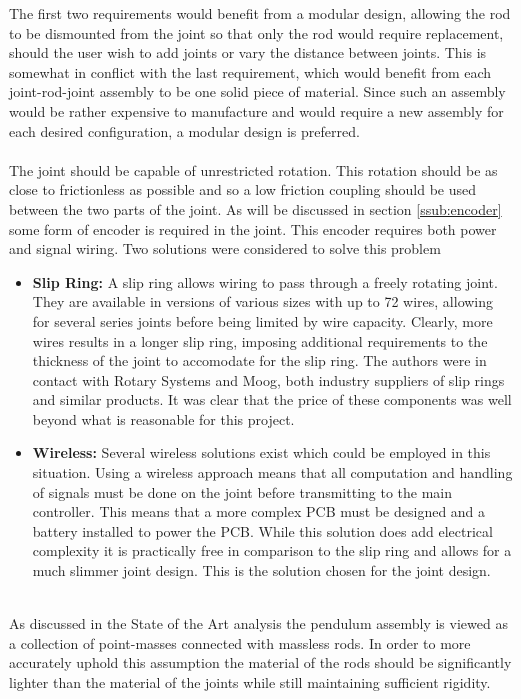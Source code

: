 The first two requirements would benefit from a modular design, allowing the rod to be dismounted from the joint so that only the rod would require replacement, should the user wish to add joints or vary the distance between joints.
This is somewhat in conflict with the last requirement, which would benefit from each joint-rod-joint assembly to be one solid piece of material.
Since such an assembly would be rather expensive to manufacture and would require a new assembly for each desired configuration, a modular design is preferred.
\\~\\
The joint should be capable of unrestricted rotation.
This rotation should be as close to frictionless as possible and so a low friction coupling should be used between the two parts of the joint.
As will be discussed in section \ref{ssub:encoder} some form of encoder is required in the joint.
This encoder requires both power and signal wiring.
Two solutions were considered to solve this problem
\begin{itemize}
  	\item \textbf{Slip Ring:} A slip ring allows wiring to pass through a freely rotating joint.
  	They are available in versions of various sizes with up to 72 wires, allowing for several series joints before being limited by wire capacity.
  	Clearly, more wires results in a longer slip ring, imposing additional requirements to the thickness of the joint to accomodate for the slip ring.
  	The authors were in contact with Rotary Systems and Moog, both industry suppliers of slip rings and similar products.
  	It was clear that the price of these components was well beyond what is reasonable for this project.
  	\item \textbf{Wireless:} Several wireless solutions exist which could be employed in this situation.
  	Using a wireless approach means that all computation and handling of signals must be done on the joint before transmitting to the main controller.
  	This means that a more complex PCB must be designed and a battery installed to power the PCB.
  	While this solution does add electrical complexity it is practically free in comparison to the slip ring and allows for a much slimmer joint design.
  	This is the solution chosen for the joint design.
\end{itemize}
~\\
As discussed in the State of the Art analysis the pendulum assembly is viewed as a collection of point-masses connected with massless rods.
In order to more accurately uphold this assumption the material of the rods should be significantly lighter than the material of the joints while still maintaining sufficient rigidity.
